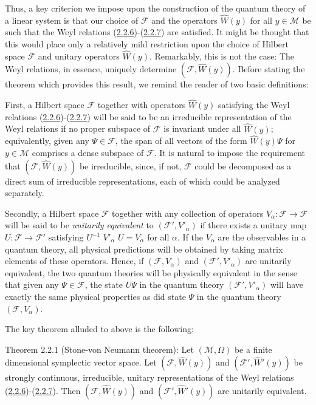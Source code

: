 \documentclass[11pt,a4paper]{article}
\begin{document}
Thus, a key criterion we impose upon the construction of the quantum theory of a linear system is that our choice of \(\mathcal{F}\) and the operators \(\hat{W}(y)\) for all \(y\in \mathcal{M}\) be such that the Weyl relations (\hyperref[eq:2.2.6]{2.2.6})-(\hyperref[eq:2.2.7]{2.2.7}) are satisfied. It might be thought that this would place only a relatively mild restriction upon the choice of Hilbert space \(\mathcal{F}\) and unitary operators \(\hat{W}(y)\). Remarkably, this is not the case: The Weyl relations, in essence, uniquely determine \((\mathcal{F}, \hat{W}(y))\). Before stating the theorem which provides this result, we remind the reader of two basic definitions:

First, a Hilbert space \(\mathcal{F}\) together with operators \(\hat{W}(y)\) satisfying the Weyl relations (\hyperref[eq:2.2.6]{2.2.6})-(\hyperref[eq:2.2.7]{2.2.7}) will be said to be an irreducible representation of the Weyl relations if no proper subspace of \(\mathcal{F}\) is invariant under all \(\hat{W}(y)\); equivalently, given any \(\Psi \in \mathcal{F}\), the span of all vectors of the form \(\hat{W}(y)\Psi\) for \(y \in \mathcal{M}\) comprises a dense subspace of \(\mathcal{F}\). It is natural to impose the requirement that \((\mathcal{F},\hat{W}(y))\) be irreducible, since, if not, \(\mathcal{F}\) could be decomposed as a direct sum of irreducible representations, each of which could be analyzed separately.

Secondly, a Hilbert space \(\mathcal{F}\) together with any collection of operators \(V_\alpha\colon \mathcal{F}\to \mathcal{F}\) will be said to be \emph{unitarily equivalent} to \((\mathcal{F}',V'_\alpha)\) if there exists a unitary map \(U\colon \mathcal{F}\to \mathcal{F}'\) satisfying \(U^{-1}\) \(V'_\alpha\) \(U=V_\alpha\) for all \(\alpha\). If the \(V_\alpha\) are the observables in a quantum theory, all physical predictions will be obtained by taking matrix elements of these operators. Hence, if \((\mathcal{F},V_\alpha)\) and \((\mathcal{F}',V'_\alpha)\) are unitarily equivalent, the two quantum theories will be physically equivalent in the sense that given any \(\Psi\in \mathcal{F}\), the state \(U\Psi\) in the quantum theory \((\mathcal{F}',V'_\alpha)\) will have exactly the same physical properties as did state \(\Psi\) in the \hypertarget{source-33}{} quantum theory \((\mathcal{F}, V_{\alpha})\).

The key theorem alluded to above is the following:

Theorem 2.2.1 (Stone-von Neumann theorem): Let \((\mathcal{M}, \Omega)\) be a finite dimensional symplectic vector space. Let \((\mathcal{F}, \hat{W}(y))\) and \((\mathcal{F}', \hat{W}'(y))\) be strongly continuous, irreducible, unitary representations of the Weyl relations (\hyperref[eq:2.2.6]{2.2.6})-(\hyperref[eq:2.2.7]{2.2.7}). Then \((\mathcal{F}, \hat{W}(y))\) and \((\mathcal{F}', \hat{W}'(y))\) are unitarily equivalent.
\end{document}
